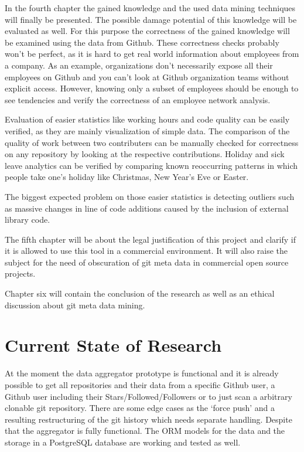 \documentclass[
  twoside,
  11pt, a4paper,
  footinclude=true,
  headinclude=true,
  cleardoublepage=empty
]{scrreprt}
\begin{document}
In the fourth chapter the gained knowledge and the used data mining techniques will finally be presented.
The possible damage potential of this knowledge will be evaluated as well. For this purpose the correctness of the gained knowledge will be examined using the data from Github.
These correctness checks probably won't be perfect, as it is hard to get real world information about employees from a company.
As an example, organizations don't necessarily expose all their employees on Github and you can't look at Github organization teams without explicit access.
However, knowing only a subset of employees should be enough to see tendencies and verify the correctness of an employee network analysis.

Evaluation of easier statistics like working hours and code quality can be easily verified, as they are mainly visualization of simple data.
The comparison of the quality of work between two contributers can be manually checked for correctness on any repository by looking at the respective contributions.
Holiday and sick leave analytics can be verified by comparing known reoccurring patterns in which people take one's holiday like Christmas, New Year's Eve or Easter.

The biggest expected problem on those easier statistics is detecting outliers such as massive changes in line of code additions caused by the inclusion of external library code.

The fifth chapter will be about the legal justification of this project and clarify if it is allowed to use this tool in a commercial environment.
It will also raise the subject for the need of obscuration of git meta data in commercial open source projects.

Chapter six will contain the conclusion of the research as well as an ethical discussion about git meta data mining.


\chapter{Current State of Research}

At the moment the data aggregator prototype is functional and it is already possible to get all repositories and their data from a specific Github user, a Github user including their Stars/Followed/Followers or to just scan a arbitrary clonable git repository.
There are some edge cases as the `force push' and a resulting restructuring of the git history which needs separate handling. Despite that the aggregator is fully functional.
The ORM models for the data and the storage in a PostgreSQL database are working and tested as well.


\begingroup
\footnotesize
\let\clearpage\relax
\endgroup
\renewcommand*{\bibfont}{\footnotesize}
\printbibliography{}
\end{document}
